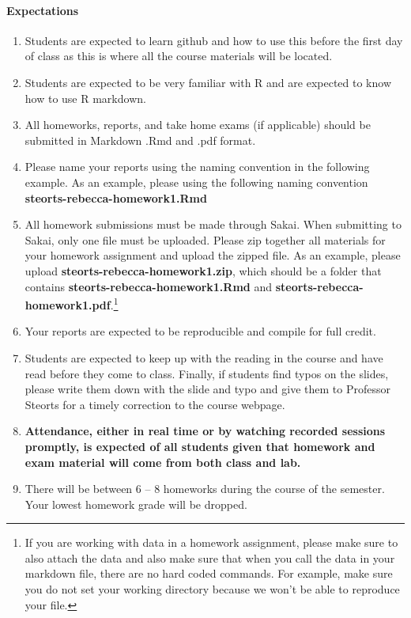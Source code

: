\documentclass[11pt]{article}
\begin{document}
\paragraph{Expectations}
\begin{enumerate}
\item Students are expected to learn github and how to use this before the first day of class as this is where all the course materials will be located. 
\item Students are expected to be very familiar with R and are expected to know how to use R markdown. 
\item All homeworks, reports, and take home exams (if applicable) should be submitted in Markdown .Rmd and .pdf format. 
\item Please name your reports using the naming convention in the following example. As an example, please using the following naming convention \textbf{steorts-rebecca-homework1.Rmd} 
\item All homework submissions must be made through Sakai. When submitting to Sakai, only one file must be uploaded. Please zip together all materials for your homework assignment and upload the zipped file. As an example, please upload \textbf{steorts-rebecca-homework1.zip}, which should be a folder that contains \textbf{steorts-rebecca-homework1.Rmd}  and \textbf{steorts-rebecca-homework1.pdf}.\footnote{If you are working with data in a homework assignment, please make sure to also attach the data and also make sure that when you call the data in your markdown file, there are no hard coded commands. For example, make sure you do not set your working directory because we won't be able to reproduce your file.}
\item Your reports are expected to be reproducible and compile for full credit. 
\item Students are expected to keep up with the reading in the course and have read before they come to class. Finally, if students find typos on the slides, please write them down with the slide and typo and give them to Professor Steorts for a timely correction to the course webpage.  
\item \textbf{Attendance, either in real time or by watching recorded sessions promptly, is expected of all students given that homework and exam material will come from both class and lab.}
\item There will be between 6 -- 8 homeworks during the course of the semester.  Your lowest homework grade will be dropped. 
\end{enumerate}
\end{document}
